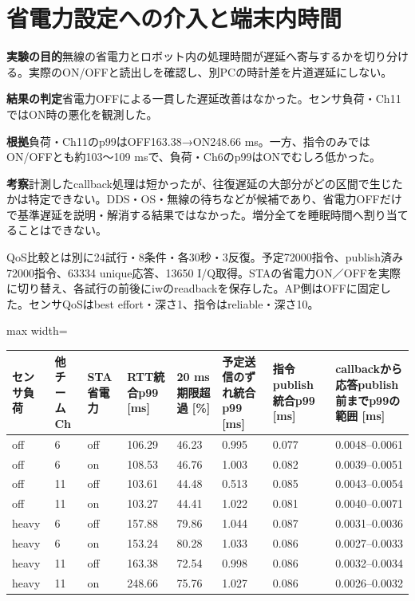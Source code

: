\documentclass[a4paper,10pt]{ltjsarticle}
\begin{document}
\section{省電力設定への介入と端末内時間}
\par\smallskip\noindent\textbf{実験の目的}\quad 無線の省電力とロボット内の処理時間が遅延へ寄与するかを切り分ける。実際のON/OFFと読出しを確認し、別PCの時計差を片道遅延にしない。

\par\smallskip\noindent\textbf{結果の判定}\quad 省電力OFFによる一貫した遅延改善はなかった。センサ負荷・Ch11ではON時の悪化を観測した。

\noindent\textbf{根拠}\quad 負荷・Ch11のp99はOFF163.38→ON248.66 ms。一方、指令のみではON/OFFとも約103〜109 msで、負荷・Ch6のp99はONでむしろ低かった。

\noindent\textbf{考察}\quad 計測したcallback処理は短かったが、往復遅延の大部分がどの区間で生じたかは特定できない。DDS・OS・無線の待ちなどが候補であり、省電力OFFだけで基準遅延を説明・解消する結果ではなかった。増分全てを睡眠時間へ割り当てることはできない。

QoS比較とは別に24試行・8条件・各30秒・3反復。予定72000指令、publish済み72000指令、63334 unique応答、13650 I/Q取得。STAの省電力ON／OFFを実際に切り替え、各試行の前後にiwのreadbackを保存した。AP側はOFFに固定した。センサQoSはbest effort・深さ1、指令はreliable・深さ10。

\begin{center}\small\begin{adjustbox}{max width=\linewidth}
\begin{tabular}{llllllll}\toprule
センサ負荷 & 他チームCh & STA省電力 & RTT統合p99 [ms] & 20 ms期限超過 [\%] & 予定送信のずれ統合p99 [ms] & 指令publish統合p99 [ms] & callbackから応答publish前までp99の範囲 [ms]\\
\midrule
off & 6 & off & 106.29 & 46.23 & 0.995 & 0.077 & 0.0048–0.0061\\
off & 6 & on & 108.53 & 46.76 & 1.003 & 0.082 & 0.0039–0.0051\\
off & 11 & off & 103.61 & 44.48 & 0.513 & 0.085 & 0.0043–0.0054\\
off & 11 & on & 103.27 & 44.41 & 1.022 & 0.081 & 0.0040–0.0071\\
heavy & 6 & off & 157.88 & 79.86 & 1.044 & 0.087 & 0.0031–0.0036\\
heavy & 6 & on & 153.24 & 80.28 & 1.033 & 0.086 & 0.0027–0.0033\\
heavy & 11 & off & 163.38 & 72.54 & 0.998 & 0.086 & 0.0032–0.0034\\
heavy & 11 & on & 248.66 & 75.76 & 1.027 & 0.086 & 0.0026–0.0032\\
\bottomrule\end{tabular}\end{adjustbox}\end{center}
\end{document}
